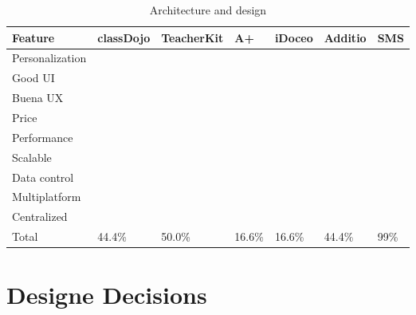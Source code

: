 \documentclass[oneside,english,titlepage]{scrbook}
\newcommand{\completeValue}{\textcolor{ownGreen}{\ding{51}}}
\newcommand{\noneValue}{\textcolor{ownRed}{\ding{55}}}
\newcommand{\partialValue}{\textcolor{ownOrange}{\ding{120}}}
\begin{document}
\begin{table}[]
\centering

\begin{tabular}{@{}lllllll@{}}

Feature & classDojo & TeacherKit & A+ & iDoceo & Additio & SMS \\ \midrule

Personalization & \noneValue & \noneValue & \noneValue & \noneValue & \noneValue & \noneValue \\

Good UI & \partialValue & \completeValue & \completeValue & \completeValue & \completeValue & \completeValue \\

Buena UX & \partialValue & \completeValue & \completeValue & \completeValue & \completeValue & \completeValue \\

Price & \noneValue & \completeValue & \completeValue & \completeValue & \completeValue & \completeValue \\

Performance & \noneValue & \noneValue & \noneValue	 & \completeValue & \completeValue & \textcolor{ownGreen}{\completeValue} \\

Scalable & \noneValue & \noneValue & \noneValue & \completeValue & \completeValue & \completeValue \\

Data control & \completeValue & \completeValue & \completeValue & \noneValue & \partialValue & \completeValue \\

Multiplatform & \noneValue & \noneValue & \noneValue & \completeValue & \completeValue & \completeValue \\

Centralized & \noneValue & \completeValue & \completeValue & \partialValue & \completeValue & \completeValue \\ \midrule

Total & 44.4\% & 50.0\% & 16.6\% & 	16.6\% & 44.4\% & 99\% \\
\end{tabular}
\caption{Architecture and design}
\label{my-label}
\end{table}


\chapter{Designe Decisions }
\end{document}
